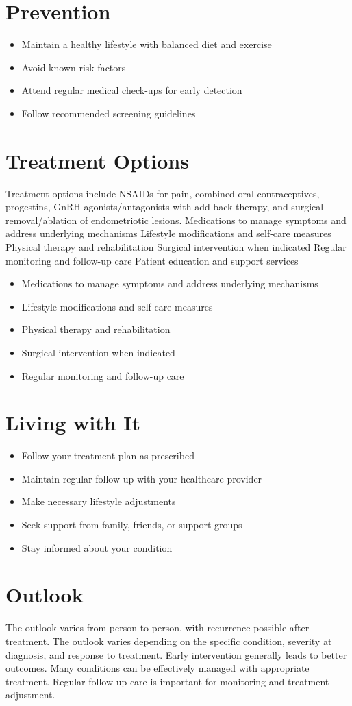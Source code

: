 \section{Prevention}
\begin{itemize}[noitemsep]
  \item Maintain a healthy lifestyle with balanced diet and exercise
  \item Avoid known risk factors
  \item Attend regular medical check-ups for early detection
  \item Follow recommended screening guidelines
\end{itemize}
\section{Treatment Options}
Treatment options include NSAIDs for pain, combined oral contraceptives, progestins, GnRH agonists/antagonists with add-back therapy, and surgical removal/ablation of endometriotic lesions. Medications to manage symptoms and address underlying mechanisms Lifestyle modifications and self-care measures Physical therapy and rehabilitation Surgical intervention when indicated Regular monitoring and follow-up care Patient education and support services

\begin{itemize}[noitemsep]
  \item Medications to manage symptoms and address underlying mechanisms
  \item Lifestyle modifications and self-care measures
  \item Physical therapy and rehabilitation
  \item Surgical intervention when indicated
  \item Regular monitoring and follow-up care
\end{itemize}
\section{Living with It}
\begin{itemize}[noitemsep]
  \item Follow your treatment plan as prescribed
  \item Maintain regular follow-up with your healthcare provider
  \item Make necessary lifestyle adjustments
  \item Seek support from family, friends, or support groups
  \item Stay informed about your condition
\end{itemize}
\section{Outlook}
The outlook varies from person to person, with recurrence possible after treatment. The outlook varies depending on the specific condition, severity at diagnosis, and response to treatment. Early intervention generally leads to better outcomes. Many conditions can be effectively managed with appropriate treatment. Regular follow-up care is important for monitoring and treatment adjustment.
